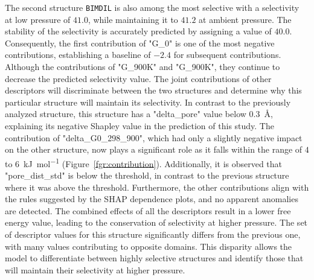 \documentclass[main]{subfiles}
\begin{document}
The second structure \texttt{BIMDIL} is also among the most selective with a selectivity at low pressure of $41.0$, while maintaining it to $41.2$ at ambient pressure. The stability of the selectivity is accurately predicted by assigning a value of $40.0$. Consequently, the first contribution of "G\_0" is one of the most negative contributions, establishing a baseline of $-2.4$ for subsequent contributions. Although the contributions of "G\_900K" and "G\_900K", they continue to decrease the predicted selectivity value. The joint contributions of other descriptors will discriminate between the two structures and determine why this particular structure will maintain its selectivity. In contrast to the previously analyzed structure, this structure has a "delta\_pore" value below \SI{0.3}{\angstrom}, explaining its negative Shapley value in the prediction of this study. The contribution of "delta\_G0\_298\_900", which had only a slightly negative impact on the other structure, now plays a significant role as it falls within the range of $4$ to \SI{6}{\kilo\joule\per\mole} (Figure~\ref{fgr:contribution}). Additionally, it is observed that "pore\_dist\_std" is below the threshold, in contrast to the previous structure where it was above the threshold. Furthermore, the other contributions align with the rules suggested by the SHAP dependence plots, and no apparent anomalies are detected. The combined effects of all the descriptors result in a lower free energy value, leading to the conservation of selectivity at higher pressure. The set of descriptor values for this structure significantly differs from the previous one, with many values contributing to opposite domains. This disparity allows the model to differentiate between highly selective structures and identify those that will maintain their selectivity at higher pressure.
\end{document}
